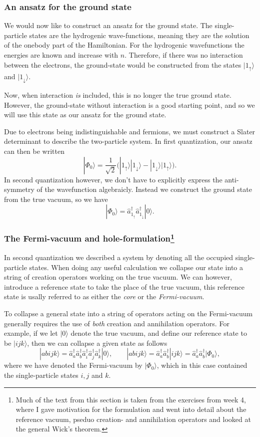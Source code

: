 \documentclass[a4paper, 11pt, notitlepage, english]{article}
\newcommand{\ket}[1]{|#1 \rangle}
\newcommand{\op}[1]{\hat{#1}}
\renewcommand{\d}{{\rm d}}
\renewcommand{\u}{\uparrow}
\renewcommand{\d}{\downarrow}
\begin{document}
\subsubsection*{An ansatz for the ground state}

We would now like to construct an ansatz for the ground state. The single-particle states are the hydrogenic wave-functions, meaning they are the solution of the onebody part of the Hamiltonian. For the hydrogenic wavefunctions the energies are known and increase with $n$. Therefore, if there was no interaction between the electrons, the ground-state would be constructed from the states $\ket{1_\u}$ and $\ket{1_\d}$. 

Now, when interaction \emph{is} included, this is no longer the true ground state. However, the ground-state without interaction is a good starting point, and so we will use this state as our ansatz for the ground state. 

Due to electrons being indistinguishable and fermions, we must construct a Slater determinant to describe the two-particle system. In first quantization, our ansatz can then be written
$$\ket{\Phi_0} = \frac{1}{\sqrt{2}}\big(\ket{1_\u}\ket{1_\d} - \ket{1_\d}\ket{1_\u}\big).$$
In second quantization however, we don't have to explicitly express the anti-symmetry of the wavefunction algebraicly. Instead we construct the ground state from the true vacuum, so we have
$$\ket{\Phi_0} = \op{a}_{1_\u}^\dagger\op{a}_{1_\d}^\dagger\ket{0}.$$

\clearpage

\subsubsection*{The Fermi-vacuum and hole-formulation\footnote{Much of the text from this section is taken from the exercises from week 4, where I gave motivation for the formulation and went into detail about the reference vacuum, pseduo creation- and annihilation operators and looked at the general Wick's theorem.}}
In second quantization we described a system by denoting all the occupied single-particle states. When doing any useful calculation we collapse our state into a string of creation operators working on the true vacuum. We can however, introduce a reference state to take the place of the true vacuum, this reference state is usally referred to as either the \emph{core} or the \emph{Fermi-vacuum}.

To collapse a general state into a string of operators acting on the Fermi-vacuum generally requires the use of \emph{both} creation and annihilation operators. For example, if we let $\ket{0}$ denote the true vacuum, and define our reference state to be $\ket{ijk}$, then we can collapse a given state as follows
$$\ket{abijk} = \op{a}_a^\dag\op{a}_b^\dag\op{a}_i^\dag\op{a}_j^\dag\op{a}_k^\dag\ket{0}, \qquad \ket{abijk} = \op{a}_a^\dag\op{a}_b^\dag\ket{ijk} = \op{a}_a^\dag\op{a}_b^\dag\ket{\Phi_0},$$
where we have denoted the Fermi-vacuum by $\ket{\Phi_0}$, which in this case contained the single-particle states $i, j$ and $k$.
\end{document}
